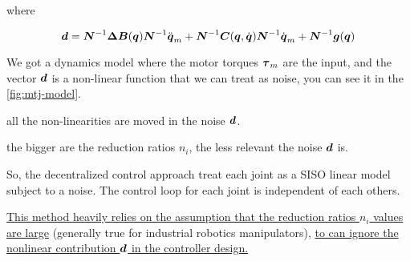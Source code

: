 where

\begin{equation}
    \boldsymbol{d} = \boldsymbol{N}^{-1} \boldsymbol{\Delta B}(\boldsymbol{q}) \boldsymbol{N}^{-1} \ddot{\boldsymbol{q}}_m +\boldsymbol{N}^{-1} \boldsymbol{C}(\boldsymbol{q},\dot{\boldsymbol{q}}) \boldsymbol{N}^{-1} \dot{\boldsymbol{q}}_m + \boldsymbol{N}^{-1} \boldsymbol{g}(\boldsymbol{q})\label{eq:decentralized-noise}
\end{equation}

We got a dynamics model where the motor torques $\boldsymbol{\tau}_m$ are the input, and the vector $\boldsymbol{d}$ is a non-linear function that we can treat as noise, you can see it in the \autoref{fig:mtj-model}.

\begin{nb}all the non-linearities are moved in the noise $\boldsymbol{d}$.\end{nb}
\begin{nb}the bigger are the reduction ratios $n_i$, the less relevant the noise $\boldsymbol{d}$ is.\end{nb}

So, the decentralized control approach treat each joint as a SISO linear model subject to a noise.
The control loop for each joint is independent of each others.

\ul{This method heavily relies on the assumption that the reduction ratios $n_i$ values are large} (generally true for industrial robotics manipulators), \ul{to can ignore the nonlinear contribution $\boldsymbol{d}$ in the controller design.}

